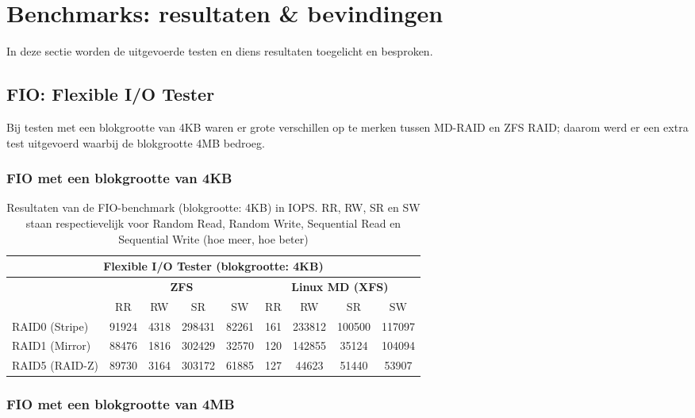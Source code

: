 \section{Benchmarks: resultaten \& bevindingen}

In deze sectie worden de uitgevoerde testen en diens resultaten toegelicht en besproken.

\subsection{FIO: Flexible I/O Tester}

Bij testen met een blokgrootte van 4KB waren er grote verschillen op te merken tussen MD-RAID en ZFS RAID; daarom werd er een extra test uitgevoerd waarbij de blokgrootte 4MB bedroeg. 

\subsubsection{FIO met een blokgrootte van 4KB}

\begin{table}[h]
  \centering
  \begin{tabular}{l || c c c c | c c c c}
    \hline
    \multicolumn{9}{c}{\textbf{Flexible I/O Tester (blokgrootte: 4KB)}} \\
    \hline
    & \multicolumn{4}{c|}{\textbf{ZFS}} & \multicolumn{4}{|c}{\textbf{Linux MD (XFS)}} \\
    & RR & RW & SR & SW & RR & RW & SR & SW \\
    \hline
    RAID0 (Stripe) & 91924 & 4318 & 298431 & 82261 & 161 & 233812 & 100500  & 117097  \\
    RAID1 (Mirror) & 88476 & 1816 & 302429 & 32570 & 120 & 142855 & 35124  & 104094 \\
    RAID5 (RAID-Z) & 89730 & 3164 & 303172 & 61885 & 127 & 44623 & 51440  & 53907 \\
  \end{tabular}
  \caption{Resultaten van de FIO-benchmark (blokgrootte: 4KB) in IOPS. RR, RW, SR en SW staan respectievelijk voor Random Read, Random Write, Sequential Read en Sequential Write (hoe meer, hoe beter)}
  \label{tab:results_fio_4k}
\end{table}

\subsubsection{FIO met een blokgrootte van 4MB}

